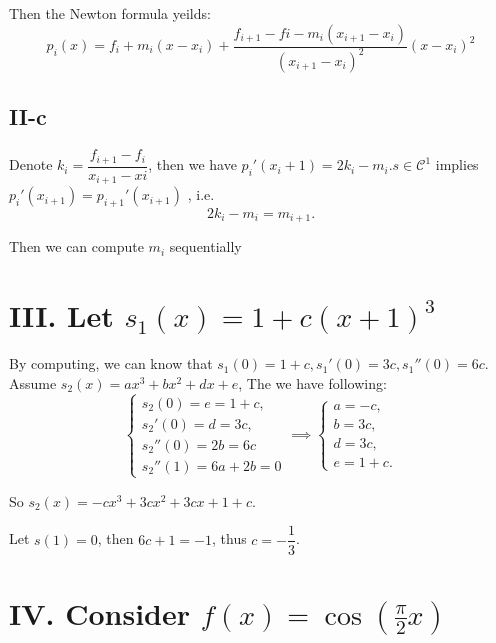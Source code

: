 \documentclass[a4paper]{article}
\begin{document}
Then the Newton formula yeilds:
\[
  p_i(x) = f_i + m_i(x-x_i) + \dfrac{f_{i+1}-f{i}-m_i(x_{i+1}-x_i)}{(x_{i+1}-x_i)^2}(x-x_i)^2
\] 

\subsection*{II-c}
Denote $k_i = \dfrac{f_{i+1}-f_i}{x_{i+1}-x{i}}$, then we have $p_i'(x_i+1) = 2k_i - m_i$.$s \in \mathcal{C}^1$ implies $p_i'(x_{i+1}) = p_{i+1}'(x_{i+1})$ , i.e. \[
2k_i - m_i = m_{i+1} .
\]

Then we can compute $m_i$ sequentially

\section*{III. Let $s_1(x) = 1 + c(x+1)^3$}
By computing, we can know that $s_1(0) = 1 + c , s_1'(0) = 3c, s_1''(0) = 6c$. Assume $s_2(x) = a x^3 +b x^2 + dx + e$, The we have following:
\[\begin{cases}
    s_2(0) = e = 1 + c, \\
    s_2'(0) = d = 3c, \\
    s_2''(0) = 2b = 6c \\
    s_2''(1) = 6a + 2b = 0 
  \end{cases}
  \implies
  \begin{cases}
    a = -c, \\
    b = 3c, \\
    d = 3c, \\
    e = 1 + c.
  \end{cases}
\]

So $s_2(x) = -cx^3 + 3cx^2 + 3cx + 1 + c$. 

Let $s(1) = 0$, then $6c + 1 = -1$, thus $c = -\dfrac{1}{3}$.
\section*{IV. Consider $f(x) = \cos(\frac{\pi}{2}x)$}
\end{document}
